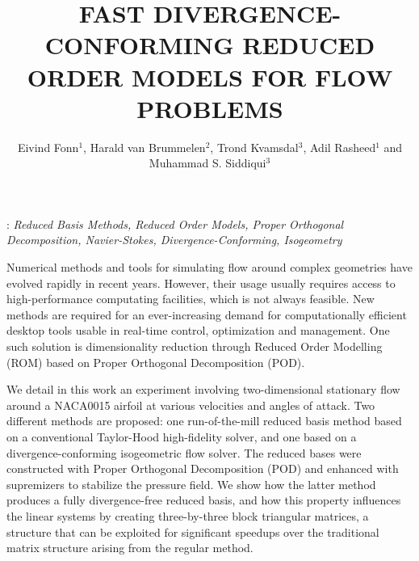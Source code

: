 \documentclass[12pt]{eccm-ecfd_abstract}
\title{FAST DIVERGENCE-CONFORMING REDUCED ORDER MODELS FOR FLOW PROBLEMS}
\author{Eivind Fonn$^{1}$, Harald van Brummelen$^{2}$, Trond Kvamsdal$^{3}$, Adil
  Rasheed$^{1}$ and Muhammad S. Siddiqui$^{3}$}
\begin{document}
: {\it Reduced Basis Methods, Reduced Order Models,
Proper Orthogonal Decomposition, Navier-Stokes, Divergence-Conforming,
Isogeometry}
\vskip0.5cm

Numerical methods and tools for simulating flow around complex geometries have
evolved rapidly in recent years. However, their usage usually requires access to
high-performance computating facilities, which is not always feasible. New
methods are required for an ever-increasing demand for computationally efficient
desktop tools usable in real-time control, optimization and management. One such
solution is dimensionality reduction through Reduced Order Modelling (ROM) based
on Proper Orthogonal Decomposition (POD).\cite{Quarteroni2016rbm}

We detail in this work an experiment involving two-dimensional stationary flow
around a NACA0015 airfoil at various velocities and angles of attack. Two
different methods are proposed: one run-of-the-mill reduced basis method based
on a conventional Taylor-Hood high-fidelity solver, and one based on a
divergence-conforming isogeometric flow solver. The reduced bases were
constructed with Proper Orthogonal Decomposition (POD) and enhanced with
supremizers\cite{Ballarin2015ssp} to stabilize the pressure field. We show how
the latter method produces a fully divergence-free reduced basis, and how this
property influences the linear systems by creating three-by-three block
triangular matrices, a structure that can be exploited for significant speedups
over the traditional matrix structure arising from the regular method.



\end{document}
